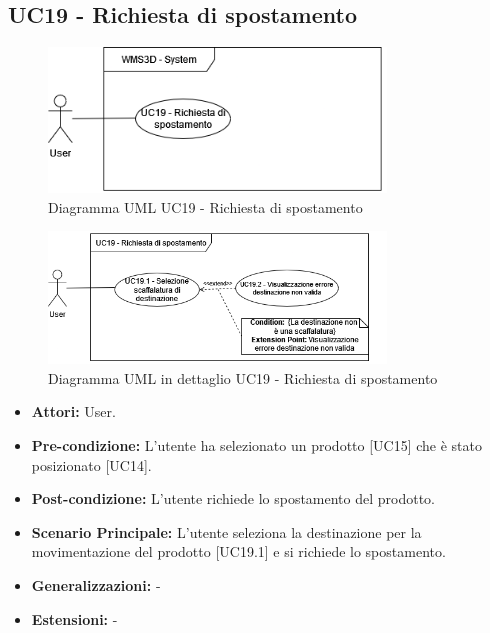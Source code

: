 \subsection{UC19 - Richiesta di spostamento}
\begin{figure}[H]
  \centering
  \includegraphics[width=0.8\textwidth]{UC_diagrams_11-20/UC19_sys.drawio.png}
   \caption{Diagramma UML UC19 - Richiesta di spostamento}
\end{figure}
\begin{figure}[H]
  \centering
  \includegraphics[width=0.8\textwidth]{UC_diagrams_11-20/UC19.drawio.png}
   \caption{Diagramma UML in dettaglio UC19 - Richiesta di spostamento}
\end{figure}
\begin{itemize}
    \item \textbf{Attori:} User.
    \item \textbf{Pre-condizione:} L'utente ha selezionato un prodotto [UC15] che è stato posizionato [UC14].
    \item \textbf{Post-condizione:} L'utente richiede lo spostamento del prodotto.
    \item \textbf{Scenario Principale:} L'utente seleziona la destinazione per la movimentazione del prodotto [UC19.1] e si richiede lo spostamento.  
    \item \textbf{Generalizzazioni:} -
    \item \textbf{Estensioni:} -
\end{itemize}


